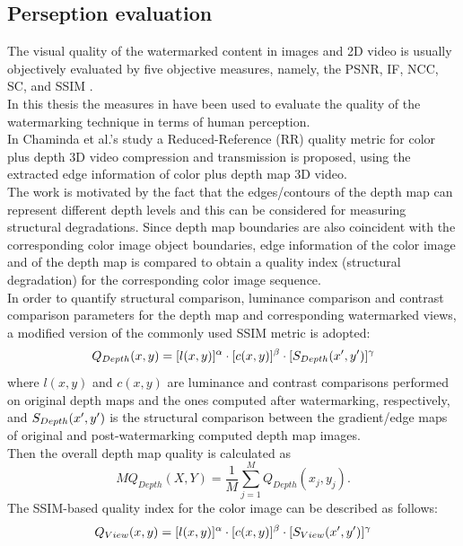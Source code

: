 \subsection{Perseption evaluation}
The visual quality of the watermarked content in images and 2D video is usually objectively evaluated by five objective measures, namely, the PSNR, IF, NCC, SC, and SSIM .\\

In this thesis the measures in \cite{QMETRICS} have been used to evaluate the quality of the watermarking technique in terms of human perception.\\
In Chaminda et al.'s study a Reduced-Reference
(RR) quality metric for color plus depth 3D video compression and transmission is proposed, using the extracted edge information of color plus depth map 3D video.\\ 
The work is motivated by the fact that the edges/contours of the depth map can represent different depth levels and this can be considered for measuring structural degradations. Since depth map boundaries are also coincident with the corresponding color image object boundaries, edge information of the color image and of the depth map is compared to obtain a quality index (structural degradation) for the corresponding color image sequence.\\
In order to quantify structural comparison, luminance comparison and contrast comparison parameters for the depth map and corresponding watermarked views, a modified version of the
commonly used SSIM metric is adopted:
\begin{equation}
Q_{Depth}(x,y) = [l(x,y)]^{\alpha} \cdot [c(x,y)]^{\beta} \cdot [\mathnormal{S}_{Depth}(x',y')]^{\gamma}
\end{equation}
where $l(x,y)$ and $c(x,y)$ are luminance and contrast comparisons performed on original depth maps and the ones computed after watermarking,
respectively, and $\mathnormal{S}_{Depth}(x',y')$  is the structural comparison between the gradient/edge maps of original and post-watermarking computed depth map images.\\
Then the overall depth map quality is calculated as
\begin{equation}
MQ_{Depth}(X,Y) = \frac{1}{M} \sum_{j=1}^{M}Q_{Depth}(x_{j},y_{j}).
\end{equation}
The SSIM-based quality index for the color image can be described as follows:
\begin{equation}
Q_{View}(x,y) = [l(x,y)]^{\alpha} \cdot [c(x,y)]^{\beta} \cdot [\mathnormal{S}_{View}(x',y')]^{\gamma}
\end{equation}
